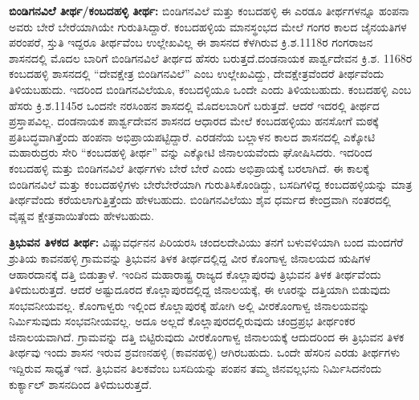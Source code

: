 \textbf{ಬಿಂಡಿಗನವಿಲೆ ತೀರ್ಥ/ಕಂಬದಹಳ್ಳಿ ತೀರ್ಥ:} ಬಿಂಡಿಗನವಿಲೆ ಮತ್ತು ಕಂಬದಹಳ್ಳಿ ಈ ಎರಡೂ ತೀರ್ಥಗಳನ್ನೂ ಹಂಪನಾ ಅವರು ಬೇರೆ ಬೇರೆಯಾಗಿಯೇ ಗುರುತಿಸಿದ್ದಾರೆ. ಕಂಬದಹಳ್ಳಿಯ ಮಾನಸ್ಥಂಭದ ಮೇಲೆ ಗಂಗರ ಕಾಲದ ಜೈನಯತಿಗಳ ಪರಂಪರೆ, ಸ್ತುತಿ ಇದ್ದರೂ ತೀರ್ಥವೆಂಬ ಉಲ್ಲೇಖವಿಲ್ಲ ಈ ಶಾಸನದ ಕೆಳಗಿರುವ ಕ್ರಿ.ಶ.1118ರ ಗಂಗರಾಜನ ಶಾಸನದಲ್ಲಿ ಮೊದಲ ಬಾರಿಗೆ ಬಿಂಡಿಗನವಿಲೆ ತೀರ್ಥದ ಹೆಸರು ಬರುತ್ತದೆ.ದಂಡನಾಯಕ ಪಾರ್ಶ್ವದೇವನ ಕ್ರಿ.ಶ. 1168ರ ಕಂಬದಹಳ್ಳಿ ಶಾಸನದಲ್ಲಿ “ದೇವಕ್ಷೇತ್ರ ಬಿಂಡಿಗನವಿಲೆ” ಎಂಬ ಉಲ್ಲೇಖವಿದ್ದು, ದೇವಕ್ಷೇತ್ರವೆಂದರೆ ತೀರ್ಥವೆಂದು ತಿಳಿಯ\-ಬಹುದು. ಇದರಿಂದ ಬಿಂಡಿಗನವಿಲೆಯೂ, ಕಂಬದಳ್ಳಿಯೂ ಒಂದೇ ಎಂದು ತಿಳಿಯಬಹುದು. ಕಂಬದಹಳ್ಳಿ ಎಂಬ ಹೆಸರು ಕ್ರಿ.ಶ.1145ರ ಒಂದನೇ ನರಸಿಂಹನ ಶಾಸದಲ್ಲಿ ಮೊದಲಬಾರಿಗೆ ಬರುತ್ತದೆ. ಆದರೆ ಇದರಲ್ಲಿ ತೀರ್ಥದ ಪ್ರಸ್ತಾಪವಿಲ್ಲ. ದಂಡನಾಯಕ ಪಾರ್ಶ್ವದೇವನ ಶಾಸನದ ಆಧಾರದ ಮೇಲೆ ಕಂಬದಹಳ್ಳಿಯು ಹನಸೋಗೆ ಮಠಕ್ಕೆ ಪ್ರತಿಬದ್ಧವಾಗಿತ್ತೆಂದು ಹಂಪನಾ ಅಭಿಪ್ರಾಯಪಟ್ಟಿದ್ದಾರೆ. ಎರಡನೆಯ ಬಲ್ಲಾಳನ ಕಾಲದ ಶಾಸನದಲ್ಲಿ ಎಕ್ಕೋಟಿ ಮಹಾರುದ್ರರು ಸೇರಿ “ಕಂಬದಹಳ್ಳಿ ತೀರ್ಥ” ವನ್ನು ಎಕ್ಕೋಟಿ ಜಿನಾಲಯವೆಂದು ಘೋಷಿಸಿದರು. ಇದರಿಂದ ಕಂಬದಹಳ್ಳಿ ಮತ್ತು ಬಿಂಡಿಗನವಿಲೆ ತೀರ್ಥಗಳು ಬೇರೆ ಬೇರೆ ಎಂದು ಅಭಿಪ್ರಾಯಕ್ಕೆ ಬರಲಾಗಿದೆ. ಈ ಕಾಲಕ್ಕೆ ಬಿಂಡಿಗನವಿಲೆ ಮತ್ತು ಕಂಬದಹಳ್ಳಿಗಳು ಬೇರೆಬೇರೆಯಾಗಿ ಗುರುತಿಸಿಕೊಂಡಿದ್ದು, ಬಸದಿಗಳಿದ್ದ ಕಂಬದಹಳ್ಳಿಯನ್ನು ಮಾತ್ರ ತೀರ್ಥವೆಂದು ಕರೆಯಲಾಗುತ್ತಿತ್ತೆಂದು ಹೇಳಬಹುದು. ಬಿಂಡಿಗನವಿಲೆಯು ಶೈವ ಧರ್ಮದ ಕೇಂದ್ರವಾಗಿ ನಂತರದಲ್ಲಿ ವೈಷ್ಣವ ಕ್ಷೇತ್ರವಾಯಿತೆಂದು ಹೇಳಬಹುದು.

\textbf{ತ್ರಿಭುವನ ತಿಳಕದ ತೀರ್ಥ:} ವಿಷ್ಣುವರ್ಧನನ ಪಿರಿಯರಸಿ ಚಂದಲದೇವಿಯು ತನಗೆ ಬಳುವಳಿಯಾಗಿ ಬಂದ ಮಂದಗೆರೆ ಶ್ರುತಿಯ ಕಾವನಹಳ್ಳಿ ಗ್ರಾಮವನ್ನು ತ್ರಿಭುವನ ತಿಳಕ ತೀರ್ಥದಲ್ಲಿದ್ದ ವೀರ ಕೊಂಗಾಳ್ವ ಜಿನಾಲಯದ ಋಷಿಗಳ ಆಹಾರದಾನಕ್ಕೆ ದತ್ತಿ ಬಿಡುತ್ತಾಳೆ. ಇಂದಿನ ಮಹಾರಾಷ್ಟ್ರ ರಾಜ್ಯದ ಕೊಲ್ಲಾಪುರವು ತ್ರಿಭುವನ ತಿಳಕ ತೀರ್ಥವೆಂದು ತಿಳಿದುಬರುತ್ತದೆ. ಆದರೆ ಅಷ್ಟುದೂರದ ಕೊಲ್ಲಾಪುರ\-ದಲ್ಲಿದ್ದ ಜಿನಾಲಯಕ್ಕೆ, ಈ ಊರನ್ನು ದತ್ತಿಯಾಗಿ ಬಿಡುವುದು ಸಂಭವನೀಯವಲ್ಲ. ಕೊಂಗಾಳ್ವರು ಇಲ್ಲಿಂದ ಕೊಲ್ಲಾಪುರಕ್ಕೆ ಹೋಗಿ ಅಲ್ಲಿ ವೀರಕೊಂಗಾಳ್ವ ಜಿನಾಲಯವನ್ನು ನಿರ್ಮಿಸುವುದು ಸಂಭವನೀಯವಲ್ಲ. ಅದೂ ಅಲ್ಲದೆ ಕೊಲ್ಲಾಪುರದಲ್ಲಿರುವುದು ಚಂದ್ರಪ್ರಭ ತೀರ್ಥಂಕರ ಜಿನಾಲಯವಾಗಿದೆ. ಗ್ರಾಮವನ್ನು ದತ್ತಿ ಬಿಟ್ಟಿರುವುದು ವೀರಕೊಂಗಾಳ್ವ ಜಿನಾಲಯಕ್ಕೆ ಆದುದರಿಂದ ಈ ತ್ರಿಭುವನ ತಿಳಕ ತೀರ್ಥವು ಇಂದು ಶಾಸನ ಇರುವ ಶ್ರವಣನಹಳ್ಳಿ (ಕಾವನಹಳ್ಳಿ) ಆಗಿರಬಹುದು. ಒಂದೇ ಹೆಸರಿನ ಎರಡು ತೀರ್ಥಗಳು ಇದ್ದಿರುವ ಸಾಧ್ಯತೆ ಇದೆ. ತ್ರಿಭುವನ ತಿಲಕವೆಂಬ ಬಸದಿಯನ್ನು ಪಂಪನ ತಮ್ಮ ಜಿನವಲ್ಲಭನು ನಿರ್ಮಿಸಿದನೆಂದು ಕುರ್ಕ್ಯಾಲ್​ ಶಾಸನದಿಂದ ತಿಳಿದುಬರುತ್ತದೆ.

